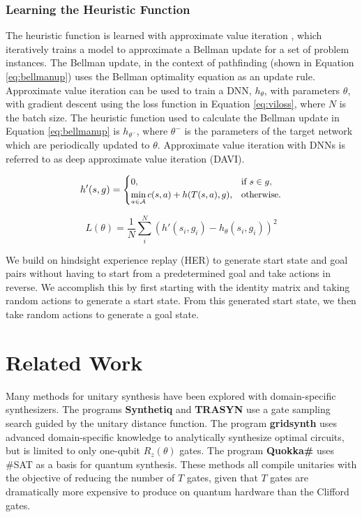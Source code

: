 \documentclass[letterpaper]{article} %
\begin{document}
\subsubsection{Learning the Heuristic Function}
The heuristic function is learned with approximate value iteration \cite{puterman1978modified,bertsekas1996neuro}, which iteratively trains a model to approximate a Bellman update for a set of problem instances. The Bellman update, in the context of pathfinding (shown in Equation \ref{eq:bellmanup}) uses the Bellman optimality equation as an update rule. Approximate value iteration can be used to train a DNN, $h_\theta$, with parameters $\theta$, with gradient descent using the loss function in Equation \ref{eq:viloss}, where $N$ is the batch size. The heuristic function used to calculate the Bellman update in Equation \ref{eq:bellmanup} is $h_{\theta^-}$, where $\theta^-$ is the parameters of the target network \cite{mnih2015human} which are periodically updated to $\theta$. Approximate value iteration with DNNs is referred to as deep approximate value iteration (DAVI).

\begin{equation} \label{eq:bellmanup}
	\small
	h'(s,g) =
	\begin{cases}
		0, & \text{if } s \in g, \\
		\min\limits_{a \in \mathcal{A}}{c(s,a) + h(T(s,a),g)}, & \text{otherwise}.
	\end{cases}
\end{equation}


\begin{equation} \label{eq:viloss}
	L({\theta}) = \frac{1}{N}\sum_{i}^N{(h'(s_i,g_i) - h_{\theta}(s_i,g_i))^2}
\end{equation}


We build on hindsight experience replay (HER) \cite{andrychowicz2017hindsight} to generate start state and goal pairs without having to start from a predetermined goal and take actions in reverse. We accomplish this by first starting with the identity matrix and taking random actions to generate a start state. From this generated start state, we then take random actions to generate a goal state.




\section{Related Work}

Many methods for unitary synthesis have been explored with domain-specific synthesizers. The programs \textbf{Synthetiq} \cite{paradis2024Synthetiq}
and \textbf{TRASYN} \cite{hao2025reducing} use a gate sampling search guided by the unitary distance function. The program \textbf{gridsynth} \cite{ross2014optimal} uses advanced domain-specific knowledge to analytically synthesize optimal circuits, but is limited to only one-qubit $R_z(\theta)$ gates.
The program \textbf{Quokka\#} \cite{zak2025reducing} uses \#SAT as a basis for quantum synthesis.
These methods all compile unitaries with the objective of reducing the number of  $T$ gates, given that $T$ gates are dramatically more expensive to produce on quantum hardware than the Clifford gates.
\end{document}
